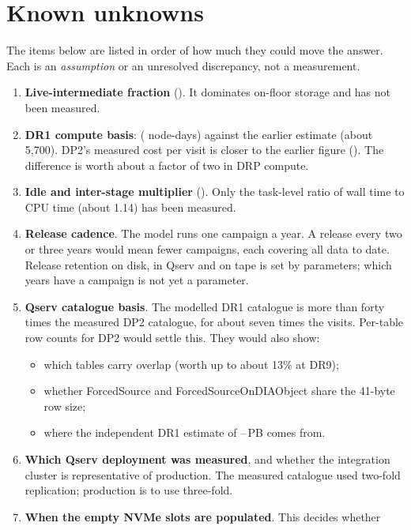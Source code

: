 \section{Known unknowns}\label{sec:upunknowns}

The items below are listed in order of how much they could move the answer.
Each is an \emph{assumption} or an unresolved discrepancy, not a measurement.

\begin{enumerate}
\item \textbf{Live-intermediate fraction} (\smLiveFrac). It dominates on-floor
      storage and has not been measured.
\item \textbf{DR1 compute basis}: \vthirty{} (\smDRoneNodeDays{} node-days)
      against the earlier \wfortyone{} estimate (about 5{,}700). DP2's measured
      cost per visit is closer to the earlier figure ().
      The difference is worth about a factor of two in DRP compute.
\item \textbf{Idle and inter-stage multiplier} (\smIdle). Only the task-level
      ratio of wall time to CPU time (about 1.14) has been measured.
\item \textbf{Release cadence}. The model runs one campaign a year. A release
      every two or three years would mean fewer campaigns, each covering all
      data to date. Release retention on disk, in Qserv and on tape is set by
      parameters; which years have a campaign is not yet a parameter.
\item \textbf{Qserv catalogue basis}. The modelled DR1 catalogue is more than
      forty times the measured DP2 catalogue, for about seven times the visits.
      Per-table row counts for DP2 would settle this. They would also show:
      \begin{itemize}
      \item which tables carry overlap (worth up to about 13\% at DR9);
      \item whether ForcedSource and ForcedSourceOnDIAObject share the 41-byte
            row size;
      \item where the independent DR1 estimate of
            \smQsPlanLowPB--\smQsPlanHighPB\,PB comes from.
      \end{itemize}
\item \textbf{Which Qserv deployment was measured}, and whether the integration
      cluster is representative of production. The measured catalogue used
      two-fold replication; production is to use three-fold.
\item \textbf{When the empty NVMe slots are populated}. This decides whether

\end{enumerate}
